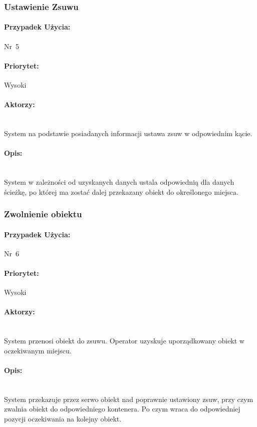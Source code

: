 \documentclass[12pt]{article}
\begin{document}
\subsubsection{Ustawienie Zsuwu}
\paragraph{Przypadek Użycia:}\mbox{Nr 5}
\paragraph{Priorytet:}\mbox{Wysoki}	
\paragraph{Aktorzy:}\mbox{} \\
System na podstawie posiadanych informacji ustawa zsuw w odpowiednim kącie.
\paragraph{Opis:}\mbox{} \\
System w zależności od uzyskanych danych ustala odpowiednią dla danych ścieżkę, po której ma zostać dalej przekazany obiekt do określonego miejsca.

\subsubsection{Zwolnienie obiektu}
\paragraph{Przypadek Użycia:}\mbox{Nr 6}
\paragraph{Priorytet:}\mbox{Wysoki}	
\paragraph{Aktorzy:}\mbox{} \\
System przenosi obiekt do zsuwu. 
Operator uzyskuje uporządkowany obiekt w oczekiwanym miejscu.
\paragraph{Opis:}\mbox{} \\
System przekazuje przez serwo obiekt nad poprawnie ustawiony zsuw, przy czym zwalnia obiekt do odpowiedniego kontenera. Po czym wraca do odpowiedniej pozycji oczekiwania na kolejny obiekt.
\end{document}
